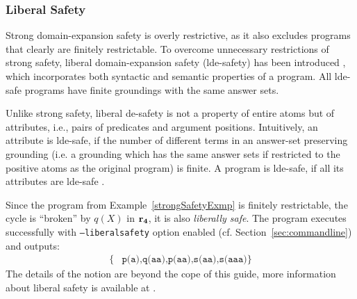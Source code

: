 \documentclass[a4paper, titlepage]{article}
\newcommand{\row}[1]{%
  \ensuremath{\color{black}\ensuremath{\mathbf{#1}} \color{black}}%
}
\begin{document}
\subsubsection{Liberal Safety}
Strong domain-expansion safety is overly restrictive, as it also excludes programs that clearly are finitely
restrictable. To overcome unnecessary restrictions of strong safety, liberal domain-expansion safety (lde-safety)
has been introduced \cite{eite-etal-14a}, which incorporates both syntactic and semantic properties of a program. All lde-safe programs have finite groundings with the same answer sets.

Unlike strong safety, liberal de-safety is not a property of entire atoms but of attributes, i.e., pairs of
predicates and argument positions. Intuitively, an attribute is lde-safe, if the number of different terms in
an answer-set preserving grounding (i.e. a grounding which has the same answer sets if restricted to the
positive atoms as the original program) is finite. A program is lde-safe, if all its attributes are lde-safe \cite{efikrs2015}.

Since the program from Example~\ref{strongSafetyExmp} is finitely restrictable, the cycle is “broken” by $\mathit{q(X)}$ in $\row{r_4}$, it is also \emph{liberally safe}. The program executes successfully with \texttt{--liberalsafety} option enabled (cf. Section~\ref{sec:commandline}) and outputs:
\begin{align*}
\{ & 
\texttt{p(a),q(aa),p(aa),s(aa),s(aaa)}
\}
\end{align*}
The details of the notion are beyond the cope of this guide, more information about liberal safety is available at \cite{eite-etal-14a}.

\newpage


\end{document}
